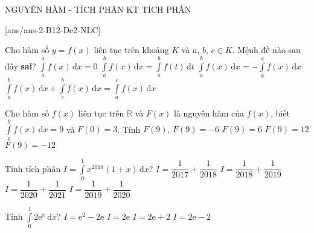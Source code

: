 \begin{name}
	{NGUYÊN HÀM - TÍCH PHÂN}
	{KT TÍCH PHÂN}
	{\tentruong}
	{\thoigian}
\end{name}
\setcounter{ex}{0}\setcounter{bt}{0}
[ans/ans-2-B12-De2-NLC]
\TN
\begin{ex}%
	Cho hàm số $y=f(x)$ liên tục trên khoảng $K$ và $a$, $b$, $c\in K$. Mệnh đề nào sau đây \textbf{sai}?
	\choice
	{$\displaystyle \int\limits_{a}^{a} f(x)\mathrm{\,d}x=0$}
	{$\displaystyle \int\limits_{a}^{b} f(x)\mathrm{\,d}x=\displaystyle \int\limits_{a}^{b} f(t) \mathrm{\,d}t$}
	{$\displaystyle \int\limits_{a}^{b} f(x)\mathrm{\,d}x=-\displaystyle \int\limits_{b}^{a} f(x) \mathrm{\,d}x$}
	{\True $\displaystyle \int\limits_{a}^{b} f(x) \mathrm{\,d}x + \displaystyle \int\limits_{c}^{b} f(x) \mathrm{\,d}x=\displaystyle \int\limits_{a}^{c} f(x) \mathrm{\,d}x$}
\end{ex}
\begin{ex}%
	Cho hàm số $f(x)$ liên tục trên $\mathbb{R}$ và $F(x)$ là nguyên hàm của $f(x)$, biết $\displaystyle \int\limits_{0}^{9} f(x)\mathrm{\,d}x=9$ và $F(0)=3$. Tính $F(9)$.
	\choice
	{$F(9)=-6$}
	{$F(9)=6$}
	{\True $F(9)=12$}
	{$F(9)=-12$}
\end{ex}
\begin{ex}%
	Tính tích phân $I=\displaystyle\int\limits_{0}^{1} x^{2018}(1 + x)\mathrm{\,d}x$?
	\choice
	{$I=\dfrac{1}{2017}+\dfrac{1}{2018}$}
	{$I=\dfrac{1}{2018}+\dfrac{1}{2019}$}
	{$I=\dfrac{1}{2020}+\dfrac{1}{2021}$}
	{\True $I=\dfrac{1}{2019} + \dfrac{1}{2020}$}
\end{ex}
\begin{ex}%
	Tính $\displaystyle \int\limits_{0}^{1} 2\mathrm{e}^{x} \mathrm{\,d}x$?
	\choice
	{$I=\mathrm{e}^2-2\mathrm{e}$}
	{$I=2\mathrm{e}$}
	{$I=2\mathrm{e}+2$}
	{\True $I=2\mathrm{e}-2$}
\end{ex}

